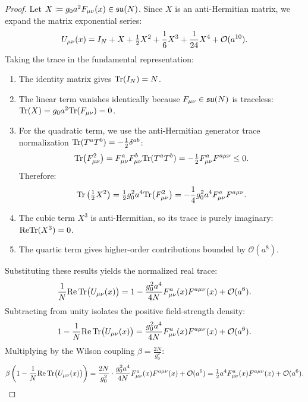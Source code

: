 \begin{proof}
Let $X \coloneqq g_0 a^2 F_{\mu\nu}(x) \in \mathfrak{su}(N)$. Since $X$ is an anti-Hermitian matrix, we expand the matrix exponential series:
\begin{equation}
U_{\mu\nu}(x) = I_N + X + \tfrac{1}{2} X^2 + \frac{1}{6} X^3 + \frac{1}{24} X^4 + \mathcal{O}(a^{10}).
\end{equation}
Taking the trace in the fundamental representation:
\begin{enumerate}
    \item The identity matrix gives $\mathrm{Tr}(I_N) = N$.
    \item The linear term vanishes identically because $F_{\mu\nu} \in \mathfrak{su}(N)$ is traceless: $\mathrm{Tr}(X) = g_0 a^2 \mathrm{Tr}(F_{\mu\nu}) = 0$.
    \item For the quadratic term, we use the anti-Hermitian generator trace normalization $\mathrm{Tr}(T^a T^b) = -\tfrac{1}{2} \delta^{ab}$:
    \begin{equation}
    \mathrm{Tr}\bigl( F_{\mu\nu}^2 \bigr) = F_{\mu\nu}^a F_{\mu\nu}^b \mathrm{Tr}(T^a T^b) = -\tfrac{1}{2} F_{\mu\nu}^a F^{a\mu\nu} \le 0.
    \end{equation}
    Therefore:
    \begin{equation}
    \mathrm{Tr}\left( \tfrac{1}{2} X^2 \right) = \tfrac{1}{2} g_0^2 a^4 \mathrm{Tr}\bigl( F_{\mu\nu}^2 \bigr) = -\frac{1}{4} g_0^2 a^4 F_{\mu\nu}^a F^{a\mu\nu}.
    \end{equation}
    \item The cubic term $X^3$ is anti-Hermitian, so its trace is purely imaginary: $\mathrm{Re} \mathrm{Tr}(X^3) = 0$.
    \item The quartic term gives higher-order contributions bounded by $\mathcal{O}(a^8)$.
\end{enumerate}
Substituting these results yields the normalized real trace:
\begin{equation}
\frac{1}{N} \mathrm{Re} \, \mathrm{Tr}\bigl( U_{\mu\nu}(x) \bigr) = 1 - \frac{g_0^2 a^4}{4N} F_{\mu\nu}^a(x) F^{a\mu\nu}(x) + \mathcal{O}(a^6).
\end{equation}
Subtracting from unity isolates the positive field-strength density:
\begin{equation}
1 - \frac{1}{N} \mathrm{Re} \, \mathrm{Tr}\bigl( U_{\mu\nu}(x) \bigr) = \frac{g_0^2 a^4}{4N} F_{\mu\nu}^a(x) F^{a\mu\nu}(x) + \mathcal{O}(a^6).
\end{equation}
Multiplying by the Wilson coupling $\beta = \frac{2N}{g_0^2}$:
\begin{equation}
\beta \left( 1 - \frac{1}{N} \RePart \, \Tr\bigl( U_{\mu\nu}(x) \bigr) \right) = \frac{2N}{g_0^2} \cdot \frac{g_0^2 a^4}{4N} F_{\mu\nu}^a(x) F^{a\mu\nu}(x) + \mathcal{O}(a^6) = \half a^4 F_{\mu\nu}^a(x) F^{a\mu\nu}(x) + \mathcal{O}(a^6).

\end{equation}
\end{proof}
